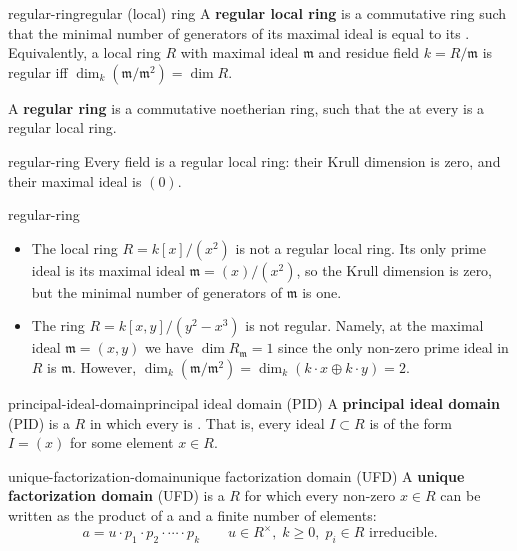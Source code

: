 \begin{topic}{regular-ring}{regular (local) ring}
    A \textbf{regular local ring} is a commutative   ring such that the minimal number of generators of its maximal ideal is equal to its . Equivalently, a local ring $R$ with maximal ideal $\mathfrak{m}$ and residue field $k = R / \mathfrak{m}$ is regular iff $\dim_k(\mathfrak{m} / \mathfrak{m}^2) = \dim R$.
    
    A \textbf{regular ring} is a commutative noetherian ring, such that the  at every  is a regular local ring.
\end{topic}

\begin{example}{regular-ring}
    Every field is a regular local ring: their Krull dimension is zero, and their maximal ideal is $(0)$.
\end{example}

\begin{example}{regular-ring}
    \begin{itemize}
        \item The local ring $R = k[x]/(x^2)$ is not a regular local ring. Its only prime ideal is its maximal ideal $\mathfrak{m} = (x)/(x^2)$, so the Krull dimension is zero, but the minimal number of generators of $\mathfrak{m}$ is one.
        \item The ring $R = k[x, y]/(y^2 - x^3)$ is not regular. Namely, at the maximal ideal $\mathfrak{m} = (x, y)$ we have $\dim R_\mathfrak{m} = 1$ since the only non-zero prime ideal in $R$ is $\mathfrak{m}$. However, $\dim_k(\mathfrak{m} / \mathfrak{m}^2) = \dim_k(k \cdot x \oplus k \cdot y) = 2$.
    \end{itemize}
\end{example}

\begin{topic}{principal-ideal-domain}{principal ideal domain (PID)}
    A \textbf{principal ideal domain} (PID) is a  $R$ in which every  is . That is, every ideal $I \subset R$ is of the form $I = (x)$ for some element $x \in R$.
\end{topic}

\begin{topic}{unique-factorization-domain}{unique factorization domain (UFD)}
    A \textbf{unique factorization domain} (UFD) is a  $R$ for which every non-zero $x \in R$ can be written as the product of a  and a finite number of  elements:
    \[ a = u \cdot p_1 \cdot p_2 \cdot \cdots \cdot p_k \qquad u \in R^\times, \; k \ge 0, \; p_i \in R \text{ irreducible}. \]
\end{topic}

